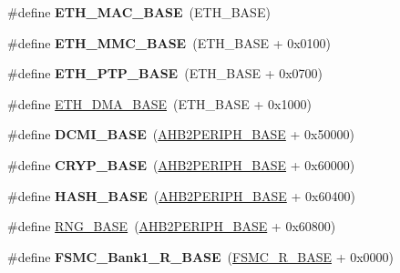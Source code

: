 \begin{DoxyCompactItemize}
\item 
\hypertarget{group___peripheral__memory__map_ga3cf7005808feb61bff1fee01e50a711a}{\#define {\bfseries E\-T\-H\-\_\-\-M\-A\-C\-\_\-\-B\-A\-S\-E}~(E\-T\-H\-\_\-\-B\-A\-S\-E)}\label{group___peripheral__memory__map_ga3cf7005808feb61bff1fee01e50a711a}

\item 
\hypertarget{group___peripheral__memory__map_ga4946f2b3b03f7998343ac1778fbcf725}{\#define {\bfseries E\-T\-H\-\_\-\-M\-M\-C\-\_\-\-B\-A\-S\-E}~(E\-T\-H\-\_\-\-B\-A\-S\-E + 0x0100)}\label{group___peripheral__memory__map_ga4946f2b3b03f7998343ac1778fbcf725}

\item 
\hypertarget{group___peripheral__memory__map_gaa0f60b922aeb7275c785cbaa8f94ecf0}{\#define {\bfseries E\-T\-H\-\_\-\-P\-T\-P\-\_\-\-B\-A\-S\-E}~(E\-T\-H\-\_\-\-B\-A\-S\-E + 0x0700)}\label{group___peripheral__memory__map_gaa0f60b922aeb7275c785cbaa8f94ecf0}

\item 
\#define \hyperlink{group___peripheral__memory__map_gace2114e1b37c1ba88d60f3e831b67e93}{E\-T\-H\-\_\-\-D\-M\-A\-\_\-\-B\-A\-S\-E}~(E\-T\-H\-\_\-\-B\-A\-S\-E + 0x1000)
\item 
\hypertarget{group___peripheral__memory__map_ga55b794507e021135486de57129a2505c}{\#define {\bfseries D\-C\-M\-I\-\_\-\-B\-A\-S\-E}~(\hyperlink{group___peripheral__memory__map_gaeedaa71d22a1948492365e2cd26cfd46}{A\-H\-B2\-P\-E\-R\-I\-P\-H\-\_\-\-B\-A\-S\-E} + 0x50000)}\label{group___peripheral__memory__map_ga55b794507e021135486de57129a2505c}

\item 
\hypertarget{group___peripheral__memory__map_ga019f3ad3b3212e56b45984efd8b8efef}{\#define {\bfseries C\-R\-Y\-P\-\_\-\-B\-A\-S\-E}~(\hyperlink{group___peripheral__memory__map_gaeedaa71d22a1948492365e2cd26cfd46}{A\-H\-B2\-P\-E\-R\-I\-P\-H\-\_\-\-B\-A\-S\-E} + 0x60000)}\label{group___peripheral__memory__map_ga019f3ad3b3212e56b45984efd8b8efef}

\item 
\hypertarget{group___peripheral__memory__map_ga398d121ca28c3f0f90a140b62184e242}{\#define {\bfseries H\-A\-S\-H\-\_\-\-B\-A\-S\-E}~(\hyperlink{group___peripheral__memory__map_gaeedaa71d22a1948492365e2cd26cfd46}{A\-H\-B2\-P\-E\-R\-I\-P\-H\-\_\-\-B\-A\-S\-E} + 0x60400)}\label{group___peripheral__memory__map_ga398d121ca28c3f0f90a140b62184e242}

\item 
\#define \hyperlink{group___peripheral__memory__map_gab92662976cfe62457141e5b4f83d541c}{R\-N\-G\-\_\-\-B\-A\-S\-E}~(\hyperlink{group___peripheral__memory__map_gaeedaa71d22a1948492365e2cd26cfd46}{A\-H\-B2\-P\-E\-R\-I\-P\-H\-\_\-\-B\-A\-S\-E} + 0x60800)
\item 
\hypertarget{group___peripheral__memory__map_gad196fe6f5e4041b201d14f43508c06d2}{\#define {\bfseries F\-S\-M\-C\-\_\-\-Bank1\-\_\-\-R\-\_\-\-B\-A\-S\-E}~(\hyperlink{group___peripheral__memory__map_gaddf0e199dccba83272b20c9fb4d3aaed}{F\-S\-M\-C\-\_\-\-R\-\_\-\-B\-A\-S\-E} + 0x0000)}\label{group___peripheral__memory__map_gad196fe6f5e4041b201d14f43508c06d2}


\end{DoxyCompactItemize}
